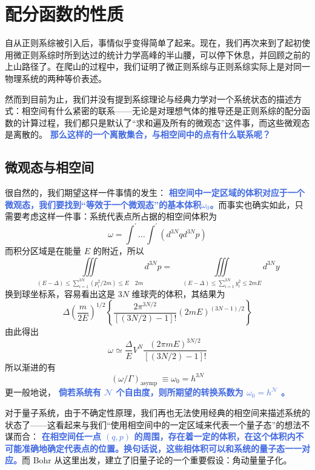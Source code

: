 \section{配分函数的性质}\label{sec:配分函数的性质}

自从正则系综被引入后，事情似乎变得简单了起来。现在，我们再次来到了起初使用微正则系综时所到达过的统计力学高峰的半山腰，可以停下休息，并回顾之前的上山路径了。在爬山的过程中，我们证明了微正则系综与正则系综实际上是对同一物理系统的两种等价表述。

然而到目前为止，我们并没有提到系综理论与经典力学对一个系统状态的描述方式：相空间有什么紧密的联系——无论是对理想气体的推导还是正则系综的配分函数的计算过程，我们都只是默认了“求和遍及所有的微观态”这件事，而这些微观态是离散的。 \textcolor{RoyalBlue}{\textbf{\kaishu 那么这样的一个离散集合，与相空间中的点有什么联系呢？}}

\subsection{微观态与相空间}

很自然的，我们期望这样一件事情的发生： \textcolor{RoyalBlue}{\textbf{\kaishu 相空间中一定区域的体积对应于一个微观态，我们要找到“等效于一个微观态”的基本体积$\omega_0$。}}而事实也确实如此，只需要考虑这样一件事：系统代表点所占据的相空间体积为
\begin{equation}
    \omega=\int^{\prime} \ldots \int^{\prime}\left(d^{3 N} q d^{3 N} p\right)
\end{equation}
而积分区域是在能量 $E$ 的附近，所以
\[
    \iiint\limits_{(E-\Delta) \leq \sum_{i=1}^{3 N}\left(p_i^2 / 2 m\right) \leq E \quad 2 m} d^{3 N} p=\quad \iiint\limits_{(E-\Delta) \leq \sum_{i=1}^{3 N} y_i^2 \leq 2 m E
    } d^{3 N} y
\]
换到球坐标系，容易看出这是 $3N$ 维球壳的体积，其结果为
\[
    \Delta\left(\frac{m}{2 E}\right)^{1 / 2}\left\{\frac{2 \pi^{3 N / 2}}{[(3 N / 2)-1] !}(2 m E)^{(3 N-1) / 2}\right\}
\]
由此得出
\[
    \omega \simeq \frac{\Delta}{E} V^N \frac{(2 \pi m E)^{3 N / 2}}{[(3 N / 2)-1] !}
\]
所以渐进的有
\begin{equation}
    (\omega / \Gamma)_{\text {asymp }} \equiv \omega_0=h^{3 N}
\end{equation}
更一般地说， \textcolor{RoyalBlue}{\textbf{\kaishu 倘若系统有 $\mathcal{N}$ 个自由度，则所期望的转换系数为 $\omega_0 = h^{\mathcal{N}}$ 。}}

对于量子系统，由于不确定性原理，我们再也无法使用经典的相空间来描述系统的状态了——这看起来与我们“使用相空间中的一定区域来代表一个量子态”的想法不谋而合： \textcolor{RoyalBlue}{\textbf{\kaishu  在相空间任一点 $(q,p)$ 的周围，存在着一定的体积，在这个体积内不可能准确地确定代表点的位置。换句话说，这些相体积可以和系统的量子态一一对应。}}而 Bohr 从这里出发，建立了旧量子论的一个重要假设：角动量量子化。

